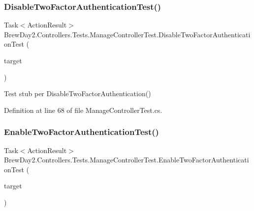 \subsubsection{\texorpdfstring{Disable\+Two\+Factor\+Authentication\+Test()}{DisableTwoFactorAuthenticationTest()}}
{\footnotesize\ttfamily Task$<$Action\+Result$>$ Brew\+Day2.\+Controllers.\+Tests.\+Manage\+Controller\+Test.\+Disable\+Two\+Factor\+Authentication\+Test (\begin{DoxyParamCaption}\item[{\mbox{[}\+Pex\+Assume\+Under\+Test\mbox{]} \mbox{\hyperlink{class_brew_day2_1_1_controllers_1_1_manage_controller}{Manage\+Controller}}}]{target }\end{DoxyParamCaption})}



Test stub per Disable\+Two\+Factor\+Authentication()



Definition at line 68 of file Manage\+Controller\+Test.\+cs.

\mbox{\label{class_brew_day2_1_1_controllers_1_1_tests_1_1_manage_controller_test_a9be92c0d9add2d1b1c91e460df584143}} 
\subsubsection{\texorpdfstring{Enable\+Two\+Factor\+Authentication\+Test()}{EnableTwoFactorAuthenticationTest()}}
{\footnotesize\ttfamily Task$<$Action\+Result$>$ Brew\+Day2.\+Controllers.\+Tests.\+Manage\+Controller\+Test.\+Enable\+Two\+Factor\+Authentication\+Test (\begin{DoxyParamCaption}\item[{\mbox{[}\+Pex\+Assume\+Under\+Test\mbox{]} \mbox{\hyperlink{class_brew_day2_1_1_controllers_1_1_manage_controller}{Manage\+Controller}}}]{target }\end{DoxyParamCaption})}



